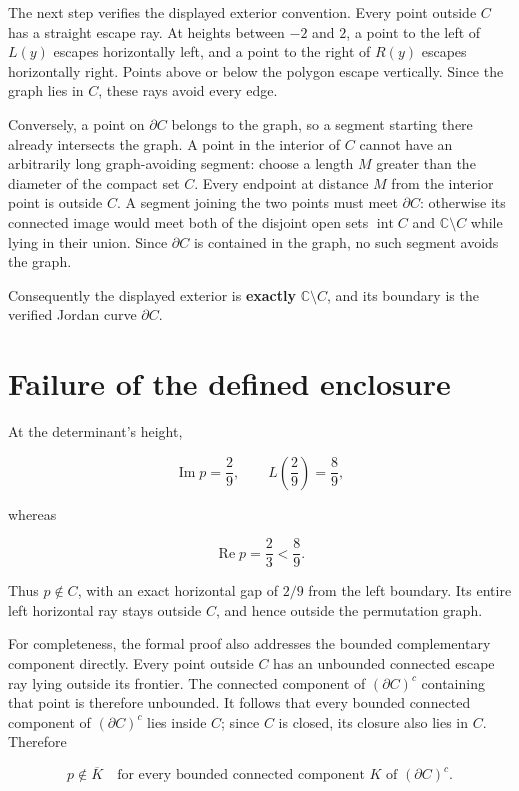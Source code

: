 \documentclass[11pt]{article}
\begin{document}
The next step verifies the displayed exterior convention. Every point outside
\(C\) has a straight escape ray. At heights between \(-2\) and \(2\), a
point to the left of \(L(y)\) escapes horizontally left, and a point to
the right of \(R(y)\) escapes horizontally right. Points above or below
the polygon escape vertically. Since the graph lies in \(C\), these rays
avoid every edge.

Conversely, a point on \(\partial C\) belongs to the graph, so a segment
starting there already intersects the graph. A point in the interior of
\(C\) cannot have an arbitrarily long graph-avoiding segment:
choose a length $M$ greater than the diameter of the compact set $C$. Every endpoint at distance $M$ from the interior point is outside $C$. A segment joining the two points must meet $\partial C$: otherwise its connected image would meet both of the disjoint open sets $\operatorname{int}C$ and $\mathbb C\setminus C$ while lying in their union. Since $\partial C$ is contained in the graph, no such segment avoids the graph.

Consequently the displayed exterior is \textbf{exactly}
\(\mathbb C\setminus C\), and its boundary is the verified Jordan curve
\(\partial C\).

\section{Failure of the defined enclosure}\label{failure-of-the-defined-enclosure}

At the determinant's height,

\[
\operatorname{Im}p=\frac29,\qquad
L\!\left(\frac29\right)=\frac89,
\]

whereas

\[
\operatorname{Re}p=\frac23<\frac89.
\]

Thus \(p\notin C\), with an exact horizontal gap of \(2/9\) from the
left boundary. Its entire left horizontal ray stays outside \(C\), and
hence outside the permutation graph.

For completeness, the formal proof also addresses the bounded
complementary component directly. Every point outside \(C\) has an
unbounded connected escape ray lying outside its frontier. The connected
component of \((\partial C)^c\) containing that point is therefore
unbounded. It follows that every bounded connected component of
\((\partial C)^c\) lies inside \(C\); since \(C\) is closed, its closure
also lies in \(C\). Therefore

\[
p\notin\overline K
\quad\text{for every bounded connected component }K
\text{ of }(\partial C)^c.
\]
\end{document}
